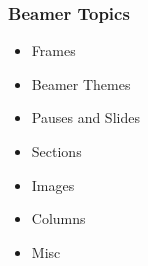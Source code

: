 \documentclass[main.tex]{subfiles}
\begin{document}
  \begin{frame}
    \frametitle{Beamer Topics}

    \begin{itemize}
      \item{Frames}\pause
      \item{Beamer Themes}\pause
      \item{Pauses and Slides}\pause
      \item{Sections}\pause
      \item{Images}\pause
      \item{Columns}\pause
      \item{Misc}
    \end{itemize}

  \end{frame}

  
\end{document}
